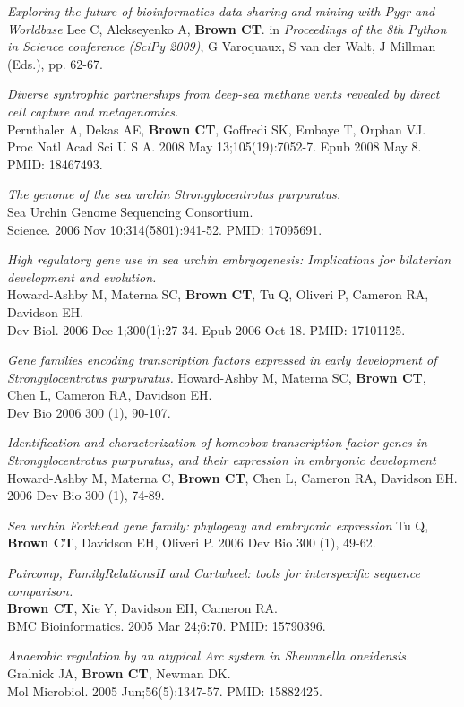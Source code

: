 \documentclass[margin,line]{resume}
\begin{document}
\begin{resume}
{\em Exploring the future of bioinformatics data sharing and mining
  with Pygr and Worldbase} Lee C, Alekseyenko A, {\bf Brown CT}.  in {\em
  Proceedings of the 8th Python in Science conference (SciPy 2009)}, G
Varoquaux, S van der Walt, J Millman (Eds.), pp. 62-67.

{\em Diverse syntrophic partnerships from deep-sea methane vents revealed by direct cell capture and metagenomics.}\\
Pernthaler A, Dekas AE, {\bf Brown CT}, Goffredi SK, Embaye T, Orphan VJ.\\
Proc Natl Acad Sci U S A. 2008 May
13;105(19):7052-7. Epub 2008 May 8.  PMID: 18467493.

{\em The genome of the sea urchin Strongylocentrotus purpuratus.}\\
Sea Urchin Genome Sequencing Consortium.\\
Science. 2006 Nov 10;314(5801):941-52.
PMID: 17095691.

{\em High regulatory gene use in sea urchin embryogenesis: Implications for bilaterian development and evolution.}\\
Howard-Ashby M, Materna SC, {\bf Brown CT}, Tu Q, Oliveri P, Cameron RA, Davidson EH.\\
Dev Biol. 2006 Dec 1;300(1):27-34. Epub 2006 Oct 18.
PMID: 17101125.

{\em Gene families encoding transcription factors expressed in early development of Strongylocentrotus purpuratus.}
Howard-Ashby M, Materna SC, {\bf Brown CT}, Chen L, Cameron RA, Davidson EH.\\
Dev Bio 2006 300 (1), 90-107.

{\em Identification and characterization of homeobox transcription factor genes in Strongylocentrotus purpuratus, and their expression in embryonic development}
Howard-Ashby M, Materna C, {\bf Brown CT}, Chen L, Cameron RA, Davidson EH.
2006 Dev Bio 300 (1), 74-89.

{\em Sea urchin Forkhead gene family: phylogeny and embryonic expression}
Tu Q, {\bf Brown CT}, Davidson EH, Oliveri P.
2006 Dev Bio 300 (1), 49-62.

{\em Paircomp, FamilyRelationsII and Cartwheel: tools for interspecific sequence comparison.}\\
{\bf Brown CT}, Xie Y, Davidson EH, Cameron RA.\\
BMC Bioinformatics. 2005 Mar 24;6:70.
PMID: 15790396.

{\em Anaerobic regulation by an
atypical Arc system in {\em Shewanella oneidensis}.}\\
Gralnick JA, {\bf Brown CT}, Newman DK.\\
Mol Microbiol. 2005
Jun;56(5):1347-57.  PMID: 15882425.


\end{resume}
\end{document}
